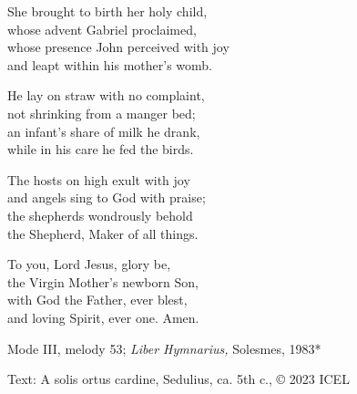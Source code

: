 \hymn



\begin{underhymnverse}
She brought to birth her holy child,\\
whose advent Gabriel proclaimed,\\
whose presence John perceived with joy\\
and leapt within his mother’s womb.

He lay on straw with no complaint,\\
not shrinking from a manger bed;\\
an infant’s share of milk he drank,\\
while in his care he fed the birds.

The hosts on high exult with joy\\
and angels sing to God with praise;\\
the shepherds wondrously behold\\
the Shepherd, Maker of all things.

To you, Lord Jesus, glory be,\\
the Virgin Mother’s newborn Son,\\
with God the Father, ever blest,\\
and loving Spirit, ever one. Amen.
\end{underhymnverse}

\begin{hymnsource}
Mode III, melody 53; \emph{Liber Hymnarius,} Solesmes, 1983*

Text: {A solis ortus cardine,} Sedulius, ca. 5th c., © 2023 ICEL
\end{hymnsource}
